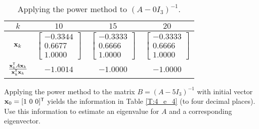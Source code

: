 \begin{activity}
\begin{table}[h]
\begin{center}
\renewcommand{\arraystretch}{2.0}
\begin{tabular}{cccc} \hline
$k$			&$10$		&$15$		&$20$		 \\ \hline %
$\mathbf{x}_k$		&$\left[ \begin{array}{r} -0.3344 \\ 0.6677 \\ 1.0000 \end{array} \right]$	&$\left[\begin{array}{r} -0.3333 \\ 0.6666 \\ 1.0000 \end{array} \right]$	&$\left[ \begin{array}{r} -0.3333 \\ 0.6666 \\ 1.0000 \end{array} \right]$		\\ \hline %
$\frac{\mathbf{x}_k^{\mathsf{T}}A\mathbf{x}_k}{\mathbf{x}_k^{\mathsf{T}}\mathbf{x}_k}$ 	&$-1.0014$	&$-1.0000$	&$-1.0000$		\\ \hline %
\end{tabular}
\caption{Applying the power method to $(A - 0I_3)^{-1}$.}
\label{T:4_e_3}
\end{center}
\end{table}





	\item Applying the power method to the matrix $B = (A - 5I_3)^{-1}$ with initial vector $\vx_0 = [1 \ 0 \ 0]^{\tr}$ yields the information in Table \ref{T:4_e_4} (to four decimal places). Use this information to estimate an eigenvalue for $A$ and a corresponding eigenvector. 


\end{activity}
